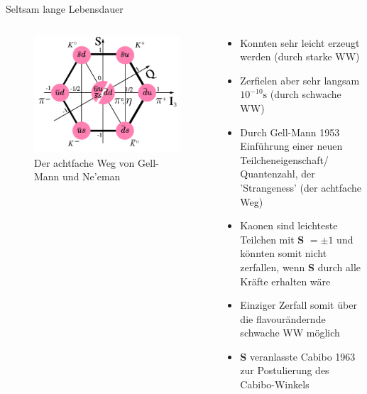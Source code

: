 \documentclass[aspectratio=1610, professionalfonts, 9pt, t]{beamer}
\begin{document}
  \begin{frame}{Seltsam lange Lebensdauer}
    \begin{columns}[onlytextwidth]
      \begin{column}{0.4\textwidth}
        \begin{figure}[ht]
          \begin{center}
            \includegraphics[height=0.6\textheight]{Images/Meson-octet.png} %
            \caption{Der achtfache Weg von Gell-Mann und Ne'eman}
          \end{center}
        \end{figure}
      \end{column}
      \begin{column}{0.5\textwidth}
        \begin{itemize}
          \item Konnten sehr leicht erzeugt werden (durch starke WW)
          \item Zerfielen aber sehr langsam $10^{-10}\si{\second}$ (durch schwache WW)
          \item Durch Gell-Mann 1953 Einführung einer neuen Teilcheneigenschaft/ Quantenzahl, der 'Strangeness' (der achtfache Weg)
          \item Kaonen sind leichteste Teilchen mit \textbf{S} $= \pm1$ und könnten somit nicht zerfallen, wenn \textbf{S} durch alle Kräfte erhalten wäre
          \item Einziger Zerfall somit über die flavourändernde schwache WW möglich
          \item \textbf{S} veranlasste Cabibo 1963 zur Postulierung des Cabibo-Winkels
        \end{itemize}
      \end{column}
    \end{columns}
  \end{frame}
\end{document}
